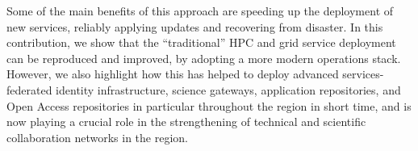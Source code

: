 Some of the main benefits of this approach are speeding up the
deployment of new services, reliably applying updates and recovering
from disaster. In this contribution, we show that the ``traditional''
HPC and grid service deployment can be reproduced and improved, by
adopting a more modern operations stack. However, we also highlight how
this has helped to deploy advanced services- federated identity
infrastructure, science gateways, application repositories, and Open
Access repositories in particular throughout the region in short time,
and is now playing a crucial role in the strengthening of technical and
scientific collaboration networks in the region.